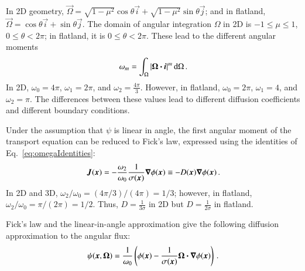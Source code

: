 \documentclass{anstrans}
\begin{document}
In 2D geometry, $\vec{\Omega}=\sqrt{1-\mu^2} \cos \theta \vec{i} +
\sqrt{1-\mu^2} \sin \theta \vec{j}$; and in flatland, $\vec{\Omega}=\cos \theta
\vec{i} + \sin \theta \vec{j}$. The domain of angular integration $\Omega$ in
2D is $-1\le\mu\le1$, $0 \le \theta < 2\pi$; in flatland, it is $0 \le \theta
< 2\pi$. These lead to the different angular moments
\begin{equation}\label{eq:omegaIdentities}
  \omega_m = \int_{\Omega} \left| \bm{\Omega}\bm{\cdot} \bm{i} \right|^m \mathop{}\!\mathrm{d}\Omega\,.
\end{equation}
In 2D, $\omega_0=4\pi$, $\omega_1=2\pi$, and $\omega_2=\frac{4\pi}{3}$.
However, in flatland, $\omega_0=2\pi$, $\omega_1=4$, and $\omega_2=\pi$. The
differences between these values lead to different diffusion 
coefficients and different boundary conditions.

Under the assumption that $\psi$ is linear in angle, the first angular moment
of the transport equation can be reduced to Fick's law, expressed using the
identities of Eq.~\eqref{eq:omegaIdentities}:
\begin{equation} \label{eq:fickGeneral}
  \bm{J}(\bm{x})
  = - \frac{\omega_2}{\omega_0} \frac{1}{\sigma(\bm{x})} \bm{\nabla} \phi(\bm{x})
  \equiv -D(\bm{x}) \bm{\nabla} \phi(\bm{x})\,.
\end{equation}
In 2D and 3D, $\omega_2/\omega_0 = (4\pi / 3) / (4\pi) = 1/3$; however, in
flatland, $\omega_2/\omega_0 = \pi / (2\pi) = 1/2$. Thus, $D=\frac{1}{3\sigma}$ in
2D but $D=\frac{1}{2\sigma}$ in flatland.

Fick's law and the linear-in-angle approximation give the following diffusion
approximation to the angular flux:
\begin{equation} \label{eq:diffusionIntensity}
  \psi(\bm{x}, \bm{\Omega})
  = \frac{1}{\omega_0} \left( \phi(\bm{x})
  - \frac{1}{\sigma(\bm{x})}
  \bm{\Omega} \bm{\cdot} \bm{\nabla} \phi(\bm{x}) \right) \,.
\end{equation}

\end{document}
